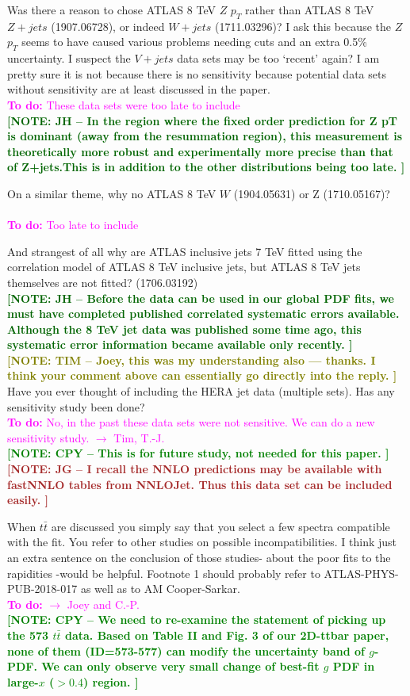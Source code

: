 \documentclass[aps,prd,amsmath,nofootinbib,floatfix,fleqn]{revtex4}
\newcommand{\TODO}[1]{\textcolor{magenta}{
\quad\vspace{3pt} \\ {\bf To do:} #1 \\
}}
\newcommand{\NOTECPY}[1]{\textcolor{green}{ \bf[NOTE: CPY -- #1 ]}}
\newcommand{\NOTEJH}[1]{\textcolor{darkgreen}{ \bf[NOTE: JH -- #1 ]}}
\newcommand{\NOTETIM}[1]{\textcolor{olive}{ \bf[NOTE: TIM -- #1 ]}}
\newcommand{\NOTEJG}[1]{\textcolor{brown}{ \bf[NOTE: JG -- #1 ]}}
\begin{document}
\noindent
Was there a reason to chose ATLAS 8 TeV $Z$ $p_T$  rather than ATLAS 8 TeV $Z+jets$ (1907.06728), or
indeed $W+jets$ (1711.03296)? I ask this because the $Z$ $p_T$ seems to have caused various problems needing cuts and an extra 0.5\% uncertainty. I suspect the $V+jets$ data sets may be too ‘recent’ again? I am pretty sure it is not because there is no sensitivity because potential data sets without sensitivity are at least discussed in the paper. 
\TODO{These data sets were too late to include}
\NOTEJH{In the region where the fixed order prediction for Z pT is dominant (away from the resummation region), this measurement is theoretically more robust and experimentally more precise than that of Z+jets.This is in addition to the other distributions being too late.}

\noindent 
On a similar theme, why no ATLAS 8 TeV $W$ (1904.05631) or Z (1710.05167)? \\
\TODO{Too late to include}

\noindent 
And strangest of all why are ATLAS inclusive jets 7 TeV fitted using the correlation model of ATLAS 8 TeV inclusive jets, but ATLAS 8 TeV jets themselves are not fitted? (1706.03192)  \\
\NOTEJH{Before the data can be used in our global PDF fits, we must have completed published correlated systematic errors available. Although the 8 TeV jet data was published some time ago, this systematic error information became available only recently.}\\
\NOTETIM{Joey, this was my understanding also --- thanks.  I think your comment above
can essentially go directly into the reply.}\\


\noindent 
Have you ever thought of including the HERA jet data (multiple sets). Has any sensitivity study been done? 
\TODO{No, in the past these data sets were not sensitive. We can do a new sensitivity study. $\to$ Tim, T.-J.}
\NOTECPY{This is for future study, not needed for this paper.}\\
\NOTEJG{I recall the NNLO predictions may be available with fastNNLO tables from NNLOJet. Thus this data set can be included easily.}


\noindent
When $t\bar t$ are discussed you simply say that you select a few spectra compatible with the fit. You refer to other studies on possible incompatibilities. I think just an extra sentence on the conclusion of those studies- about the poor fits to the rapidities -would be helpful. Footnote 1 should probably refer to ATLAS-PHYS-PUB-2018-017 as well as to AM Cooper-Sarkar. 
\TODO{$\to$ Joey and C.-P.}
\NOTECPY{We need to re-examine the statement of picking up the 573 $t \bar t$ data. Based on Table II and Fig. 3 of our 2D-ttbar paper, none of them (ID=573-577) can modify the uncertainty band of $g$-PDF. We can only observe very small change of best-fit $g$ PDF in large-$x$ ($> 0.4$) region.}\\
\end{document}

